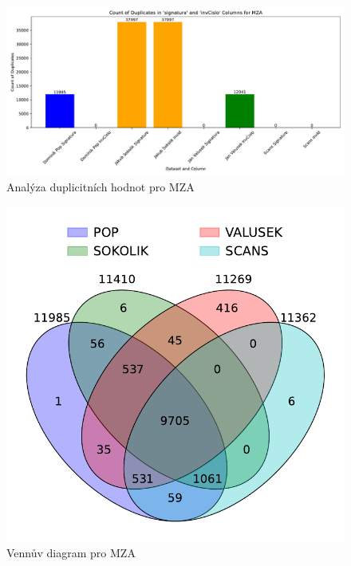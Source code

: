 \begin{figure}[htbp]
\centering
    \includegraphics[scale=.5]{obrazky-figures/dataAnalysis/mza/duplicities.pdf}
    \caption{Analýza duplicitních hodnot pro MZA}
\end{figure}

\begin{figure}[htbp]
\centering
    \includegraphics[scale=.5]{obrazky-figures/dataAnalysis/mza/Venn_4.pdf}
    \caption{Vennův diagram pro MZA}
\end{figure}

